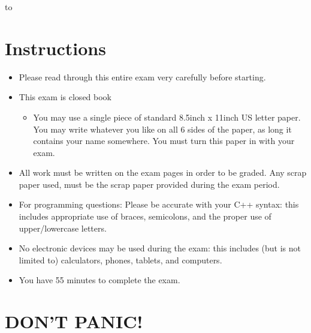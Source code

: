 \documentclass[11pt,answers]{exam}
\begin{document}
\begin{center} 
\end{center}

\lstset{language=C++,numbers=left, numberstyle=\tiny, stepnumber=1, numbersep=5pt, showstringspaces=true}

\vspace{0.1in} 
\hbox to \textwidth{Name:\enspace\hrulefill}

\section*{Instructions}
\begin{itemize}
\item Please read through this entire exam very carefully before starting. 
\item This exam is closed book
\begin{itemize}
  \item You may use a single piece of standard 8.5inch x 11inch US letter paper. You may write whatever you like on all 6 sides of the paper, as long it contains your name somewhere. You must turn this paper in with your exam.
\end{itemize}
\item All work must be written on the exam pages in order to be graded. Any scrap paper used, must be the scrap paper provided during the exam period.
\item For programming questions: Please be accurate with your C++ syntax: this includes appropriate use of braces, semicolons, and the proper use of upper/lowercase letters.  
\item No electronic devices may be used during the exam: this includes (but is not limited to) calculators, phones, tablets, and computers.
\item You have 55 minutes to complete the exam.  
\end{itemize}

\section*{DON'T PANIC!}
\end{document}
